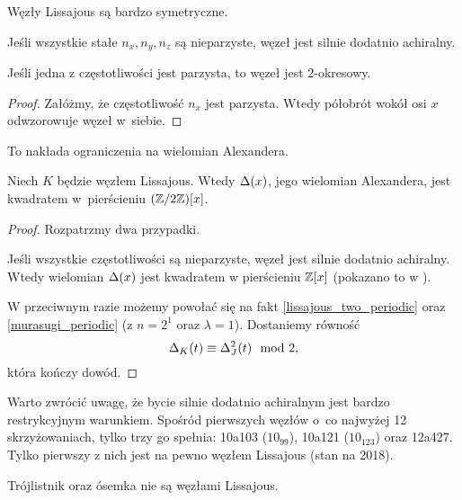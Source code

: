Węzły Lissajous są bardzo symetryczne.

\begin{proposition}
    Jeśli wszystkie stałe $n_x, n_y, n_z$ są nieparzyste, węzeł jest silnie dodatnio achiralny.
\end{proposition}

\begin{proposition}
    \label{lissajous_two_periodic}
    Jeśli jedna z częstotliwości jest parzysta, to węzeł jest 2-okresowy.
\end{proposition}

\begin{proof}
    Załóżmy, że częstotliwość $n_x$ jest parzysta.
    Wtedy półobrót wokół osi $x$ odwzorowuje węzeł w~siebie.
\end{proof}

To nakłada ograniczenia na wielomian Alexandera.

\begin{proposition}
    \label{lissajous_square}
    Niech $K$ będzie węzłem Lissajous.
    Wtedy $\Delta(x)$, jego wielomian Alexandera, jest kwadratem w~pierścieniu $(\mathbb Z/2\mathbb Z)[x]$.
\end{proposition}

\begin{proof}
    Rozpatrzmy dwa przypadki.

    Jeśli wszystkie częstotliwości są nieparzyste, węzeł jest silnie dodatnio achiralny.
    Wtedy wielomian $\Delta(x)$ jest kwadratem w pierścieniu $\mathbb Z[x]$ (pokazano to w \cite{hartley79}).

    W przeciwnym razie możemy powołać się na fakt \ref{lissajous_two_periodic} oraz \ref{murasugi_periodic} (z $n=2^1$ oraz $\lambda = 1$).
    Dostaniemy równość
    \begin{equation}
    	\label{lissajous_square_equiv}
        \Delta_K(t) \equiv \Delta^2_{J}(t) \mod 2,
    \end{equation}
    która kończy dowód.
\end{proof}

Warto zwrócić uwagę, że bycie silnie dodatnio achiralnym jest bardzo restrykcyjnym warunkiem.
Spośród pierwszych węzłów o~co najwyżej 12 skrzyżowaniach, tylko trzy go spełnia: 10a103 ($10_{99}$), 10a121 ($10_{123}$) oraz 12a427.
Tylko pierwszy z nich jest na pewno węzłem Lissajous (stan na 2018).

\begin{example}
    Trójlistnik oraz ósemka nie są węzłami Lissajous.
\end{example}

